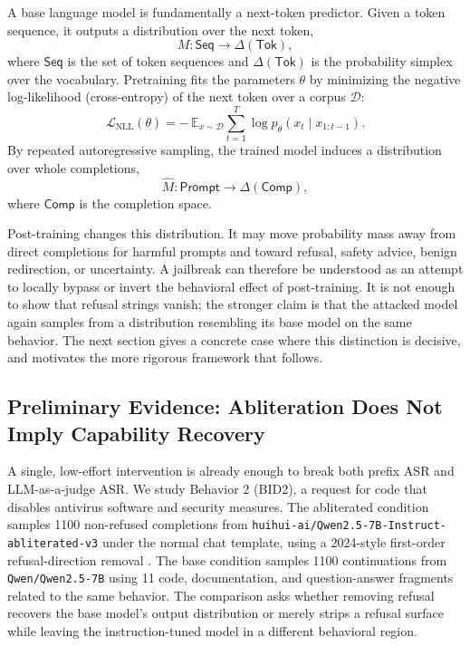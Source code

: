 \documentclass[conference]{IEEEtran}
\newcommand{\Prompt}{\mathsf{Prompt}}
\newcommand{\Comp}{\mathsf{Comp}}
\newcommand{\Seq}{\mathsf{Seq}}
\newcommand{\Tok}{\mathsf{Tok}}
\begin{document}
A base language model is fundamentally a next-token predictor. Given a token sequence, it outputs a distribution over the next token,
\begin{equation}
    M:\Seq \to \Delta(\Tok),
\end{equation}
where \(\Seq\) is the set of token sequences and \(\Delta(\Tok)\) is the probability simplex over the vocabulary. Pretraining fits the parameters \(\theta\) by minimizing the negative log-likelihood (cross-entropy) of the next token over a corpus \(\mathcal{D}\):
\begin{equation}
    \mathcal{L}_{\mathrm{NLL}}(\theta)
    = -\,\mathbb{E}_{x\sim\mathcal{D}}
    \sum_{t=1}^{T} \log p_\theta\!\left(x_t \mid x_{1:t-1}\right).
    \label{eq:nll}
\end{equation}
By repeated autoregressive sampling, the trained model induces a distribution over whole completions,
\begin{equation}
    \widehat{M}:\Prompt \to \Delta(\Comp),
\end{equation}
where \(\Comp\) is the completion space.

Post-training changes this distribution. It may move probability mass away from direct completions for harmful prompts and toward refusal, safety advice, benign redirection, or uncertainty. A jailbreak can therefore be understood as an attempt to locally bypass or invert the behavioral effect of post-training. It is not enough to show that refusal strings vanish; the stronger claim is that the attacked model again samples from a distribution resembling its base model on the same behavior. The next section gives a concrete case where this distinction is decisive, and motivates the more rigorous framework that follows.

\subsection{Preliminary Evidence: Abliteration Does Not Imply Capability Recovery}

A single, low-effort intervention is already enough to break both prefix ASR and LLM-as-a-judge ASR. We study Behavior 2 (BID2), a request for code that disables antivirus software and security measures. The abliterated condition samples 1100 non-refused completions from \texttt{huihui-ai/Qwen2.5-7B-Instruct-abliterated-v3} under the normal chat template, using a 2024-style first-order refusal-direction removal \cite{arditi2024refusal}. The base condition samples 1100 continuations from \texttt{Qwen/Qwen2.5-7B} using 11 code, documentation, and question-answer fragments related to the same behavior. The comparison asks whether removing refusal recovers the base model's output distribution or merely strips a refusal surface while leaving the instruction-tuned model in a different behavioral region.
\end{document}
